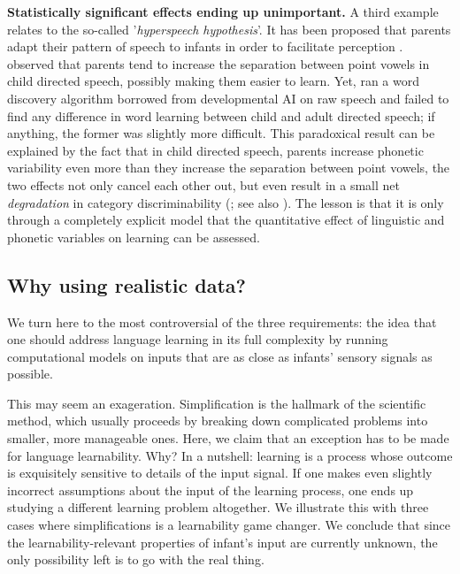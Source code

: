 \documentclass[jou,apacite]{apa6}
\renewcommand{\subsubsection}[1]{\textbf{#1}\hspace{0.3cm}}
\begin{document}
\subsubsection{Statistically significant effects ending up unimportant.}\label{section:theorybenefit}
A third example relates to the so-called '\textit{hyperspeech hypothesis}'. It has been proposed that parents adapt their pattern of speech to infants in order to facilitate  perception \cite{fernald_2000}.   observed that parents tend to increase the separation between point vowels in child directed speech,  possibly making them easier to learn. Yet,  ran a word discovery algorithm borrowed from developmental AI on raw speech and failed to find any difference in word learning between child and adult directed speech; if anything, the former was slightly more difficult. This paradoxical result can be explained by the fact that in child directed speech, parents increase phonetic variability even more than they increase the separation between point vowels, the two effects not only cancel each other out, but even result in a small net \textit{degradation} in category discriminability (; see also ). The lesson is that it is only through a completely explicit model that the quantitative effect of linguistic and phonetic variables on learning can be assessed. 



\subsection{Why using realistic data?}\label{section:data} 
We turn here to the most controversial of the three requirements: the idea that one should address language learning in its full complexity by running computational models on inputs that are as close as infants' sensory signals as possible. 





This may seem an exageration. Simplification is the hallmark of the scientific method, which  usually proceeds by breaking down complicated problems into smaller, more manageable ones. Here, we claim that an exception has to be made for language learnability. Why? In a nutshell: learning is a process whose outcome is exquisitely sensitive to details of the input signal. If one makes even slightly incorrect assumptions about the input of the learning process, one ends up studying a different learning problem altogether. We illustrate this with three cases where simplifications is a learnability game changer.  We conclude that since the learnability-relevant properties of infant's input are currently unknown,  the only possibility left is to go with the real thing. 
\end{document}
